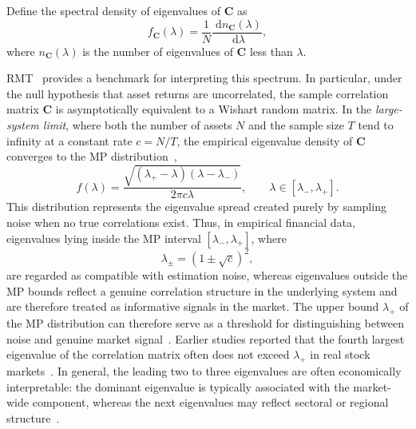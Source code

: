 \documentclass[pdflatex,sn-basic]{sn-jnl}%
\theoremstyle{thmstyleone}%
\theoremstyle{thmstyletwo}%
\theoremstyle{thmstylethree}%
\newcommand{\bC}{\boldsymbol{C}}
\newcommand{\brc}[1]{\left( #1 \right)}
\renewcommand{\d}{\; \mathrm{d}}
\begin{document}
Define the spectral density of eigenvalues of $\bC$ as
\begin{equation}
    \label{eqn:empirical_eigenvalue_distribution}
    f_{\bC}\brc{\lambda} = \frac{1}{N} \frac{\d n_{\bC}(\lambda)}{\d\lambda},
\end{equation}
where $n_{\bC}(\lambda)$ is the number of eigenvalues of $\bC$ less than $\lambda$. 


RMT~\citep{bouchaud2003theory} provides a benchmark for interpreting this spectrum. 
In particular, under the null hypothesis that asset returns are uncorrelated,
the sample correlation matrix $\bC$ is asymptotically equivalent to a Wishart random
matrix. In the \emph{large-system limit}, where both the number of assets $N$ and the
sample size $T$ tend to infinity at a constant rate $c = N/T$, the empirical
eigenvalue density of $\bC$ converges to the MP distribution~\citep{marchenko1967distribution},
\begin{equation}
\label{eqn:mp_law}
    f\brc{\lambda} = \frac{\sqrt{\brc{\lambda_{+} - \lambda}\brc{\lambda-\lambda_{-}}}}{2\pi c\lambda}, \qquad \lambda\in[\lambda_{-},\lambda_{+}].
\end{equation}
This distribution represents the eigenvalue spread created purely by sampling noise when no true correlations exist. Thus, in empirical financial data, eigenvalues lying inside the MP interval $[\lambda_-,\lambda_+]$, where
\begin{equation}
\label{eqn:mp_bounds}
    \lambda_{\pm} = \left(1 \pm \sqrt{c}\right)^2,
\end{equation}
are regarded as compatible with estimation noise, whereas eigenvalues outside the MP bounds reflect a genuine correlation structure in the underlying system and are therefore treated as informative signals in the market. 
The upper bound $\lambda_{+}$ of the MP distribution can therefore serve as a threshold for distinguishing between noise and genuine market signal~\citep{laloux1999noise, plerou2002random}. Earlier studies reported that the fourth largest eigenvalue of the correlation matrix often does not exceed $\lambda_{+}$ in real stock markets~\citep[e.g.,][]{molero2025random}. In general, the leading two to three eigenvalues are often economically interpretable: the dominant eigenvalue is typically associated with the market-wide component, whereas the next eigenvalues may reflect sectoral or regional structure~\citep{plerou2002random}.
\end{document}
